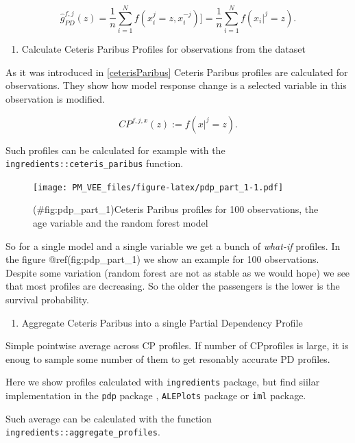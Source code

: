 \documentclass[12pt,]{krantz}
\providecommand{\tightlist}{%
  \setlength{\itemsep}{0pt}\setlength{\parskip}{0pt}}
\begin{document}
\[
\hat g_{PD}^{f, j}(z) = \frac 1n \sum_{i=1}^{N} f(x_i^j=z, x^{-j}_i)] = \frac 1n \sum_{i=1}^{N} f(x_i|^j=z).
\]

\begin{enumerate}
\def\labelenumi{\arabic{enumi}.}
\tightlist
\item
  Calculate Ceteris Paribus Profiles for observations from the dataset
\end{enumerate}

As it was introduced in \ref{ceterisParibus} Ceteris Paribus profiles are calculated for observations. They show how model response change is a selected variable in this observation is modified.

\[
CP^{f, j, x}(z) := f(x|^j = z).
\]

Such profiles can be calculated for example with the \texttt{ingredients::ceteris\_paribus} function.

\begin{figure}
\centering
\texttt{[image: PM\_VEE\_files/figure-latex/pdp\_part\_1-1.pdf]}
\caption{(\#fig:pdp\_part\_1)Ceteris Paribus profiles for 100 observations, the age variable and the random forest model}
\end{figure}

So for a single model and a single variable we get a bunch of \emph{what-if} profiles. In the figure @ref(fig:pdp\_part\_1) we show an example for 100 observations. Despite some variation (random forest are not as stable as we would hope) we see that most profiles are decreasing. So the older the passengers is the lower is the survival probability.

\begin{enumerate}
\def\labelenumi{\arabic{enumi}.}
\setcounter{enumi}{1}
\tightlist
\item
  Aggregate Ceteris Paribus into a single Partial Dependency Profile
\end{enumerate}

Simple pointwise average across CP profiles. If number of CPprofiles is large, it is enoug to sample some number of them to get resonably accurate PD profiles.

Here we show profiles calculated with \texttt{ingredients} package, but find siilar implementation in the \texttt{pdp} package \citep{pdp}, \texttt{ALEPlots} package \citep{R-ALEPlot} or \texttt{iml} \citep{iml} package.

Such average can be calculated with the function \texttt{ingredients::aggregate\_profiles}.
\end{document}
